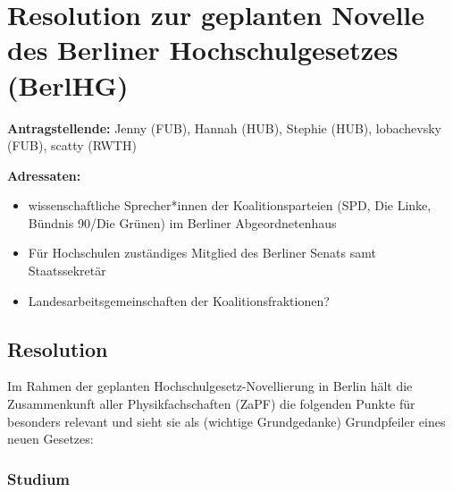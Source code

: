 \hypertarget{resolution-zur-geplanten-novelle-des-berliner-hochschulgesetzes-berlhg}{%
\section{Resolution zur geplanten Novelle des Berliner Hochschulgesetzes
(BerlHG)}\label{resolution-zur-geplanten-novelle-des-berliner-hochschulgesetzes-berlhg}}

\textbf{Antragstellende:} Jenny (FUB), Hannah (HUB), Stephie (HUB),
lobachevsky (FUB), scatty (RWTH)

\textbf{Adressaten:}

\begin{itemize}
\tightlist
\item
  wissenschaftliche Sprecher*innen der Koalitionsparteien (SPD, Die
  Linke, Bündnis 90/Die Grünen) im Berliner Abgeordnetenhaus
\item
  Für Hochschulen zuständiges Mitglied des Berliner Senats samt
  Staatssekretär
\item
  Landesarbeitsgemeinschaften der Koalitionsfraktionen?
\end{itemize}

\hypertarget{resolution}{%
\subsection{Resolution}\label{resolution}}

Im Rahmen der geplanten Hochschulgesetz-Novellierung in Berlin hält die
Zusammenkunft aller Physikfachschaften (ZaPF) die folgenden Punkte für
besonders relevant und sieht sie als (wichtige Grundgedanke)
Grundpfeiler eines neuen Gesetzes:

\hypertarget{studium}{%
\subsubsection{Studium}\label{studium}}


